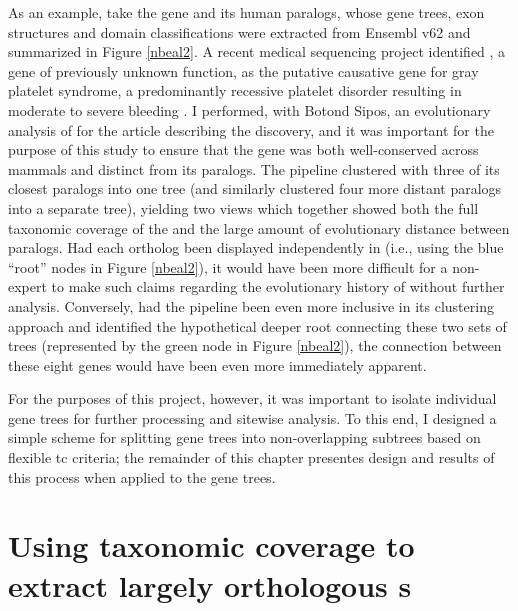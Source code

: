 As an example, take the gene  and its human paralogs,
whose gene trees, exon structures and domain classifications were
extracted from Ensembl v62 and summarized in Figure \ref{nbeal2}. A
recent medical sequencing project identified , a gene of
previously unknown function, as the putative causative gene for gray
platelet syndrome, a predominantly recessive platelet disorder
resulting in moderate to severe bleeding \citep{Albers2011}. I
performed, with Botond Sipos, an evolutionary analysis of
 for the article describing the discovery, and it was
important for the purpose of this study to ensure that the
 gene was both well-conserved across mammals and distinct
from its paralogs. The \cmp pipeline clustered  with
three of its closest paralogs into one tree (and similarly clustered
four more distant  paralogs into a separate tree),
yielding two views which together showed both the full taxonomic
coverage of the  \subtr{} and the large amount of
evolutionary distance between paralogs. Had each \mammln ortholog been
displayed independently in \ens (i.e., using the blue ``\euth root''
nodes in Figure \ref{nbeal2}), it would have been more difficult for a
non-expert to make such claims regarding the evolutionary history of
 without further analysis. Conversely, had the \cmp
pipeline been even more inclusive in its clustering approach and
identified the hypothetical deeper root connecting these two sets of
trees (represented by the green node in Figure \ref{nbeal2}), the
connection between these eight genes would have been even more
immediately apparent.

For the purposes of this project, however, it was important to isolate
individual \mammln gene trees for further processing and sitewise
analysis. To this end, I designed a simple scheme for splitting gene
trees into non-overlapping subtrees based on flexible \ac{tc}
criteria; the remainder of this chapter presentes design and results
of this process when applied to the \cmp gene trees.

\section{Using taxonomic coverage to extract largely orthologous \mammln \subtr{}s}


